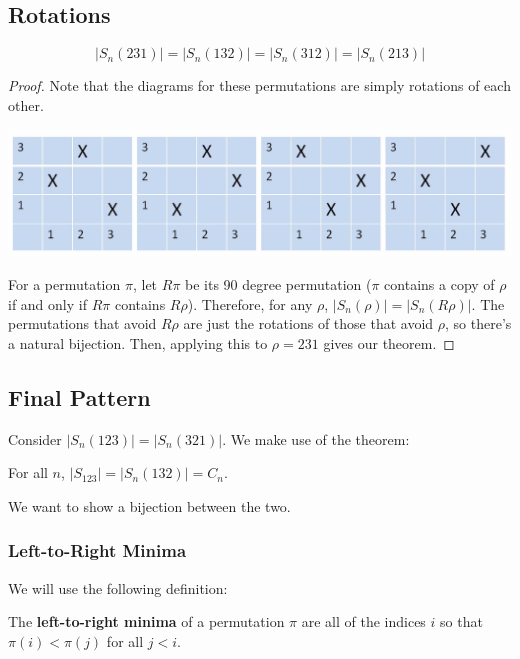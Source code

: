 \documentclass[letterpaper]{article}
\begin{document}
\subsection{Rotations}
\begin{lemma}{}{}
    \[|S_{n}(231)| = |S_{n}(132)| = |S_{n}(312)| = |S_{n}(213)|\]
\end{lemma}
\begin{proof}
    Note that the diagrams for these permutations are simply rotations of each other.
    \begin{center}
        \includegraphics[scale=0.4]{perm_rotation.PNG}
    \end{center}
    For a permutation $\pi$, let $R\pi$ be its 90 degree permutation ($\pi$ contains a copy of $\rho$ if and only if $R\pi$ contains $R\rho$). Therefore, for any $\rho$, $|S_{n}(\rho)| = |S_{n}(R\rho)|$. The permutations that avoid $R\rho$ are just the rotations of those that avoid $\rho$, so there's a natural bijection. Then, applying this to $\rho = 231$ gives our theorem. 
\end{proof}

\subsection{Final Pattern}
Consider $|S_{n}(123)| = |S_{n}(321)|$. We make use of the theorem:
\begin{theorem}{}{}
    For all $n$, $|S_{123}| = |S_{n}(132)| = C_n$. 
\end{theorem} 
We want to show a bijection between the two. 

\subsubsection{Left-to-Right Minima}
We will use the following definition:
\begin{definition}{}{}
    The \textbf{left-to-right minima} of a permutation $\pi$ are all of the indices $i$ so that $\pi(i) < \pi(j)$ for all $j < i$. 
\end{definition}
\end{document}
